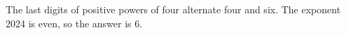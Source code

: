The last digits of positive powers of four alternate four and six. The exponent 2024 is even, so the answer is $\boxed6$.
